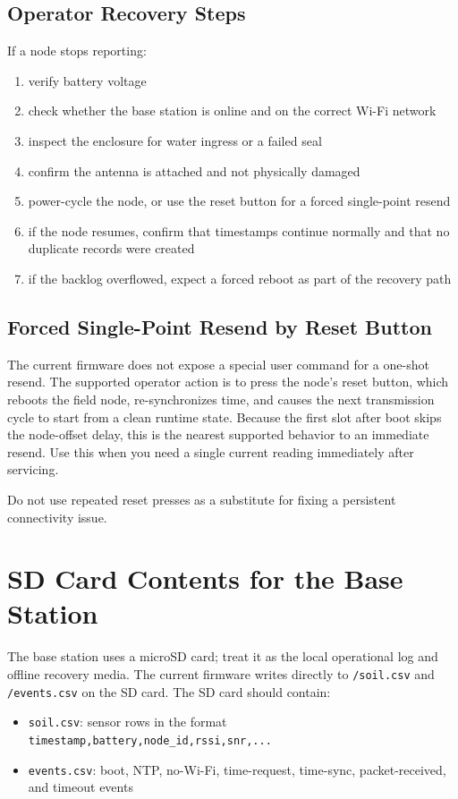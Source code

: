 \documentclass[11pt]{article}
\begin{document}
\subsection{Operator Recovery Steps}
If a node stops reporting:
\begin{enumerate}
    \item verify battery voltage
    \item check whether the base station is online and on the correct Wi-Fi network
    \item inspect the enclosure for water ingress or a failed seal
    \item confirm the antenna is attached and not physically damaged
    \item power-cycle the node, or use the reset button for a forced single-point resend
    \item if the node resumes, confirm that timestamps continue normally and that no duplicate records were created
    \item if the backlog overflowed, expect a forced reboot as part of the recovery path
\end{enumerate}

\subsection{Forced Single-Point Resend by Reset Button}
The current firmware does not expose a special user command for a one-shot resend. The supported operator action is to press the node's reset button, which reboots the field node, re-synchronizes time, and causes the next transmission cycle to start from a clean runtime state. Because the first slot after boot skips the node-offset delay, this is the nearest supported behavior to an immediate resend. Use this when you need a single current reading immediately after servicing.

Do not use repeated reset presses as a substitute for fixing a persistent connectivity issue.

\section{SD Card Contents for the Base Station}
The base station uses a microSD card; treat it as the local operational log and offline recovery media. The current firmware writes directly to \texttt{/soil.csv} and \texttt{/events.csv} on the SD card. The SD card should contain:
\begin{itemize}
    \item \texttt{soil.csv}: sensor rows in the format \texttt{timestamp,battery,node\_id,rssi,snr,...}
    \item \texttt{events.csv}: boot, NTP, no-Wi-Fi, time-request, time-sync, packet-received, and timeout events
\end{itemize}
\end{document}

